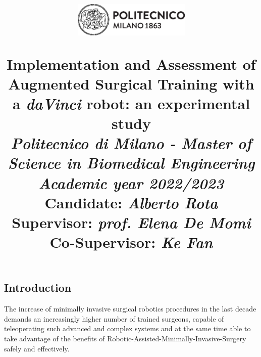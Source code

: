 \documentclass{article}
\title{
\begin{figure}[h!]
\centering
\includegraphics[width=0.5\textwidth]{images/logo_polimi_scritta2.eps}
\end{figure}
\textbf{Implementation and Assessment of Augmented Surgical Training with a \textit{daVinci} robot: an experimental study}
\\
\vspace{0.5cm}\large{\textit{Politecnico di Milano - Master of Science in Biomedical Engineering}}
\\
\vspace{0.5cm}\textit{\small{Academic year 2022/2023}}\vspace{0.5cm}\\
{\large \textbf{Candidate: \textit{Alberto Rota}}\\
\textbf{Supervisor: \textit{prof. Elena De Momi}}\\
\textbf{Co-Supervisor: \textit{Ke Fan}}}}
\author{}
\date{}
\begin{document}
\maketitle
\begin{multicols}{2}
\section{Introduction}

The increase of minimally invasive surgical robotics procedures in the last decade demands an increasingly higher number of trained surgeons, capable of teleoperating such advanced and complex systems and at the same time able to take advantage of the benefits of Robotic-Assisted-Minimally-Invasive-Surgery safely and effectively. 



\end{multicols}
\end{document}

